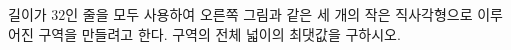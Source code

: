 \noindent\begin{minipage}[t]{0.58\linewidth}\vspace{0pt}\raggedright 길이가 $32$인 줄을 모두 사용하여 오른쪽 그림과 같은 세 개의 작은 직사각형으로 이루어진 구역을 만들려고 한다. 구역의 전체 넓이의 최댓값을 구하시오. \end{minipage}\hfill\begin{minipage}[t]{0.4\linewidth}\vspace{0pt}\centering \resizebox{\ifdim\width>\linewidth\linewidth\else\width\fi}{!}{}\end{minipage}\par
